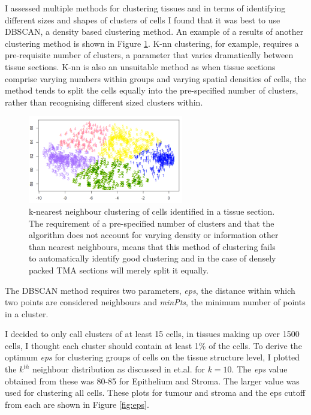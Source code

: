 I assessed multiple methods for clustering tissues and in terms of identifying different sizes and shapes of clusters of cells I found that it was best to use DBSCAN, a density based clustering method. An example of a results of another clustering method is shown in Figure \ref{fig:clust_bad}. K-nn clustering, for example, requires a pre-requisite number of clusters, a parameter that varies dramatically between tissue sections. K-nn is also an unsuitable method as when tissue sections comprise varying numbers within groups and varying spatial densities of cells, the method tends to split the cells equally into the pre-specified number of clusters, rather than recognising different sized clusters within.

\begin{figure}
    \centering
    \includegraphics{Chapter3/Figs/knn_example_2.png}
    \caption[k-nearest neighbour clustering of cells]{k-nearest neighbour clustering of cells identified in a tissue section. The requirement of a pre-specified number of clusters and that the algorithm does not account for varying density or information other than nearest neighbours, means that this method of clustering fails to automatically identify good clustering and in the case of densely packed TMA sections will merely split it equally.}
    \label{fig:clust_bad}
\end{figure}


The DBSCAN method requires two parameters, \textit{eps}, the distance within which two points are considered neighbours and \textit{minPts}, the minimum number of points in a cluster.

I decided to only call clusters of at least 15 cells, in tissues making up over 1500 cells, I thought each cluster should contain at least 1\% of the cells. To derive the optimum \textit{eps} for clustering groups of cells on the tissue structure level, I plotted the $k^{th}$ neighbour distribution as discussed in et.al. for $k=10$. The \textit{eps} value obtained from these was 80-85 for Epithelium and Stroma. The larger value was used for clustering all cells. These plots for tumour and stroma and the eps cutoff from each are shown in Figure \ref{fig:eps}.

